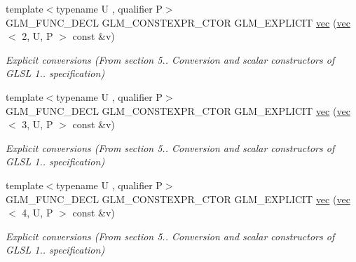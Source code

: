 \begin{DoxyCompactItemize}
{\footnotesize template$<$typename U , qualifier P$>$ }\\G\+L\+M\+\_\+\+F\+U\+N\+C\+\_\+\+D\+E\+CL G\+L\+M\+\_\+\+C\+O\+N\+S\+T\+E\+X\+P\+R\+\_\+\+C\+T\+OR G\+L\+M\+\_\+\+E\+X\+P\+L\+I\+C\+IT \hyperlink{structglm_1_1vec_3_011_00_01T_00_01Q_01_4_a48714830341cbda646b425d42ae72314}{vec} (\hyperlink{structglm_1_1vec}{vec}$<$ 2, U, P $>$ const \&v)
\begin{DoxyCompactList}\small\item\em Explicit conversions (From section 5.. Conversion and scalar constructors of G\+L\+SL 1.. specification) \end{DoxyCompactList}\item 
\mbox{\label{structglm_1_1vec_3_011_00_01T_00_01Q_01_4_ab2af72d32392be4ad056d846d6552a85}} 
{\footnotesize template$<$typename U , qualifier P$>$ }\\G\+L\+M\+\_\+\+F\+U\+N\+C\+\_\+\+D\+E\+CL G\+L\+M\+\_\+\+C\+O\+N\+S\+T\+E\+X\+P\+R\+\_\+\+C\+T\+OR G\+L\+M\+\_\+\+E\+X\+P\+L\+I\+C\+IT \hyperlink{structglm_1_1vec_3_011_00_01T_00_01Q_01_4_ab2af72d32392be4ad056d846d6552a85}{vec} (\hyperlink{structglm_1_1vec}{vec}$<$ 3, U, P $>$ const \&v)
\begin{DoxyCompactList}\small\item\em Explicit conversions (From section 5.. Conversion and scalar constructors of G\+L\+SL 1.. specification) \end{DoxyCompactList}\item 
\mbox{\label{structglm_1_1vec_3_011_00_01T_00_01Q_01_4_afe3da36b0ef8bf292c65f2846dc6db9a}} 
{\footnotesize template$<$typename U , qualifier P$>$ }\\G\+L\+M\+\_\+\+F\+U\+N\+C\+\_\+\+D\+E\+CL G\+L\+M\+\_\+\+C\+O\+N\+S\+T\+E\+X\+P\+R\+\_\+\+C\+T\+OR G\+L\+M\+\_\+\+E\+X\+P\+L\+I\+C\+IT \hyperlink{structglm_1_1vec_3_011_00_01T_00_01Q_01_4_afe3da36b0ef8bf292c65f2846dc6db9a}{vec} (\hyperlink{structglm_1_1vec}{vec}$<$ 4, U, P $>$ const \&v)
\begin{DoxyCompactList}\small\item\em Explicit conversions (From section 5.. Conversion and scalar constructors of G\+L\+SL 1.. specification) \end{DoxyCompactList}\item 
\mbox{\label{structglm_1_1vec_3_011_00_01T_00_01Q_01_4_abd93e6bf42d506d85f4aea0c5d92ecc2}} 

\end{DoxyCompactItemize}
